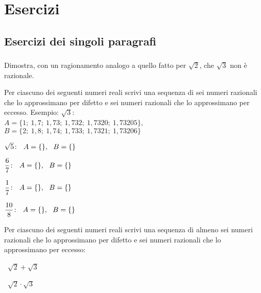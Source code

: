 
\section{Esercizi}

\subsection{Esercizi dei singoli paragrafi}

\subsubsection*{}

\begin{esercizio}
\label{ese:1.1}
Dimostra, con un ragionamento analogo a quello fatto per \(\sqrt 2\), che 
\(\sqrt 3\) non è razionale.
\end{esercizio}

\begin{esercizio}
\label{ese:1.2}
Per ciascuno dei seguenti numeri reali scrivi una sequenza di sei numeri 
razionali che lo approssimano per difetto e sei numeri razionali che lo 
approssimano per eccesso. Esempio:
\(\sqrt 3\):\\
\(A=\{1;~1,7;~1,73;~1,732;~1,7320;~1,73205\}\),\\
\(B=\{2;~1,8;~1,74;~1,733;~1,7321;~1,73206\}\)
\begin{enumeratea}
\item\(\sqrt{5}\!:~~A=\{\dotfill\},~~ B=\{\dotfill\}\)
\item\(\dfrac{6}{7}\!:~~A=\{\dotfill\},~~ B=\{\dotfill\}\)
\item\(\dfrac{1}{7}\!:~~A=\{\dotfill\},~~ B=\{\dotfill\}\)
\item\(\dfrac{10}{8}\!:~~A=\{\dotfill\},~~ B=\{\dotfill\}\)
\end{enumeratea}
\end{esercizio}


\begin{esercizio}
\label{ese:1.3}
Per ciascuno dei seguenti numeri reali scrivi una sequenza di almeno sei 
numeri razionali che lo approssimano per difetto e sei numeri razionali che 
lo approssimano per eccesso:
\begin{htmulticols}{2}
\begin{enumeratea}
\item~\(\sqrt {2}+\sqrt {3}\)
\item~\(\sqrt {2}\cdot\sqrt {3}\)
\end{enumeratea}
\end{htmulticols}
\end{esercizio}

